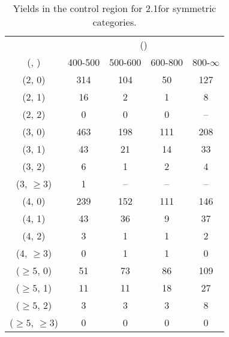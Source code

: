 \begin{table}[h!]
\tiny
\centering
\caption{Yields in the \gj control region for 2.1\ifb for symmetric categories.\label{tab:yieldssep_gj_data_sym}}
\begin{tabular}
{ccccc}
	\hline\hline
	& \multicolumn{4}{c}{\scalht (\gev)} \\ 
	 (\njet,  \nb) & 400-500 & 500-600 & 600-800 & 800-$\infty$ \\ [0.8ex] 
\hline
	(2, 0) & 314 & 104 & 50 & 127 \\[0.5ex] 
	(2, 1) & 16 & 2 & 1 & 8 \\[0.5ex] 
	(2, 2) & 0 & 0 & 0 & -- \\[0.5ex] 
	(3, 0) & 463 & 198 & 111 & 208 \\[0.5ex] 
	(3, 1) & 43 & 21 & 14 & 33 \\[0.5ex] 
	(3, 2) & 6 & 1 & 2 & 4 \\[0.5ex] 
	(3, $\ge3$) & 1 & -- & -- & -- \\[0.5ex] 
	(4, 0) & 239 & 152 & 111 & 146 \\[0.5ex] 
	(4, 1) & 43 & 36 & 9 & 37 \\[0.5ex] 
	(4, 2) & 3 & 1 & 1 & 2 \\[0.5ex] 
	(4, $\ge3$) & 0 & 1 & 1 & 0 \\[0.5ex] 
	($\ge5$, 0) & 51 & 73 & 86 & 109 \\[0.5ex] 
	($\ge5$, 1) & 11 & 11 & 18 & 27 \\[0.5ex] 
	($\ge5$, 2) & 3 & 3 & 3 & 8 \\[0.5ex] 
	($\ge5$, $\ge3$) & 0 & 0 & 0 & 0 \\[0.5ex] 
	\hline
	\hline
\end{tabular}
\end{table}
